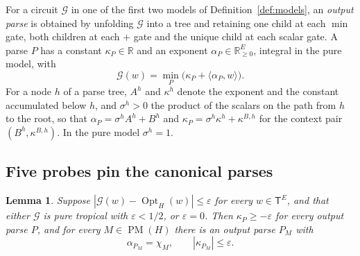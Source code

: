 \documentclass[11pt]{article}
\newtheorem{lemma}[theorem]{Lemma}
\newcommand{\Opt}{\operatorname{Opt}}
\newcommand{\PM}{\operatorname{PM}}
\begin{document}
For a circuit $\mathcal G$ in one of the first two models of
Definition~\ref{def:models}, an \emph{output parse} is obtained by unfolding
$\mathcal G$ into a tree and retaining one child at each $\min$ gate, both
children at each $+$ gate and the unique child at each scalar gate.  A parse $P$
has a constant $\kappa_P\in\mathbb R$ and an exponent
$\alpha_P\in\mathbb R_{\ge0}^{E}$, integral in the pure model, with
\begin{equation}
  \mathcal G(w)=\min_P\bigl(\kappa_P+\langle\alpha_P,w\rangle\bigr).
  \label{eq:parse}
\end{equation}
For a node $h$ of a parse tree, $A^h$ and $\kappa^h$ denote the exponent and the
constant accumulated below $h$, and $\sigma^h>0$ the product of the scalars on
the path from $h$ to the root, so that $\alpha_P=\sigma^hA^h+B^h$ and
$\kappa_P=\sigma^h\kappa^h+\kappa^{B,h}$ for the context pair
$(B^h,\kappa^{B,h})$.  In the pure model $\sigma^h=1$.

\subsection{Five probes pin the canonical parses}

\begin{lemma}
\label{lem:pin-full}
Suppose $|\mathcal G(w)-\Opt_H(w)|\le\varepsilon$ for every $w\in\mathsf T^{E}$,
and that either $\mathcal G$ is pure tropical with $\varepsilon<1/2$, or
$\varepsilon=0$.  Then $\kappa_P\ge-\varepsilon$ for every output parse $P$, and
for every $M\in\PM(H)$ there is an output parse $P_M$ with
\[
  \alpha_{P_M}=\chi_M,
  \qquad
  |\kappa_{P_M}|\le\varepsilon .
\]
\end{lemma}
\end{document}
